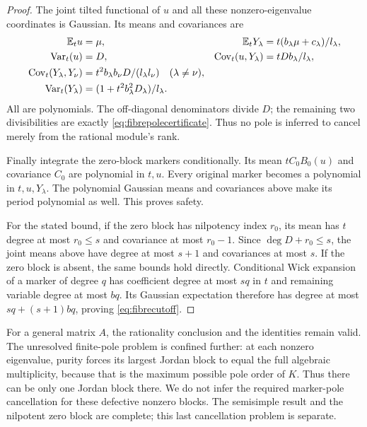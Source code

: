 \begin{proof}
The joint tilted functional of $u$ and all these nonzero-eigenvalue
coordinates is Gaussian. Its means and covariances are
\begin{align*}
 \mathbb E_tu&=\mu,&\mathbb E_tY_\lambda
   &=t(b_\lambda\mu+c_\lambda)/l_\lambda,\\
 \operatorname{Var}_t(u)&=D,&
 \operatorname{Cov}_t(u,Y_\lambda)&=tDb_\lambda/l_\lambda,\\
 \operatorname{Cov}_t(Y_\lambda,Y_\nu)
   &=t^2b_\lambda b_\nu D/(l_\lambda l_\nu)\quad(\lambda\ne\nu),&&\\
 \operatorname{Var}_t(Y_\lambda)
   &=(1+t^2b_\lambda^2D_\lambda)/l_\lambda.&&
\end{align*}
All are polynomials. The off-diagonal denominators divide $D$;
the remaining two divisibilities are exactly
\eqref{eq:fibrepolecertificate}. Thus no pole is inferred to
cancel merely from the rational module's rank.

Finally integrate the zero-block markers conditionally. Its
mean $tC_0B_0(u)$ and covariance $C_0$ are polynomial in $t,u$.
Every original marker becomes a polynomial in $t,u,Y_\lambda$.
The polynomial Gaussian means and covariances above make its
period polynomial as well. This proves safety.

For the stated bound, if the zero block has nilpotency index
$r_0$, its mean has $t$ degree at most $r_0\le s$ and covariance
at most $r_0-1$. Since $\deg D+r_0\le s$, the joint means
above have degree at most $s+1$ and covariances at most $s$.
If the zero block is absent, the same bounds hold directly.
Conditional Wick expansion of a marker of degree $q$ has
coefficient degree at most $sq$ in $t$ and remaining variable
degree at most $bq$. Its Gaussian expectation therefore has
degree at most $sq+(s+1)bq$, proving
\eqref{eq:fibrecutoff}.
\end{proof}

For a general matrix $A$, the rationality conclusion and the
identities remain valid. The unresolved finite-pole problem is
confined further: at each nonzero eigenvalue, purity forces its
largest Jordan block to equal the full algebraic multiplicity,
because that is the maximum possible pole order of $K$.
Thus there can be only one Jordan block there. We do not infer
the required marker-pole cancellation for these defective
nonzero blocks. The semisimple result and the nilpotent zero
block are complete; this last cancellation problem is separate.
